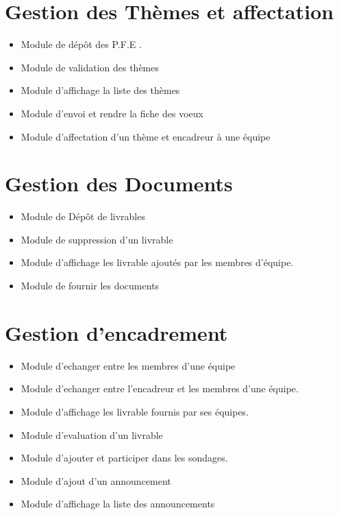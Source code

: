 \documentclass[11pt,fleqn]{book} %
\begin{document}
\section{Gestion des Thèmes et affectation}
\begin{itemize}
    \item Module de dépôt des P.F.E .
    \item Module de validation des thèmes
    \item Module d'affichage la liste des thèmes
    \item Module d'envoi et rendre la fiche des voeux
    \item Module d'affectation d'un thème et encadreur à une équipe\\
\end{itemize}


\section{Gestion des Documents}
\begin{itemize}
    \item Module de	Dépôt de livrables
    \item Module de suppression d'un livrable
    \item Module d'affichage les livrable ajoutés par les membres d'équipe.
    \item Module de fournir les documents\\
\end{itemize}


\section{Gestion d'encadrement}
\begin{itemize}
    \item Module d'echanger entre les membres d'une équipe
    \item Module d'echanger entre l'encadreur et les membres d'une équipe.
    \item Module d'affichage les livrable fournis par ses équipes.
    \item Module d'evaluation d'un livrable
    \item Module d'ajouter et participer dans les sondages.
    \item Module d'ajout d'un announcement
    \item Module d'affichage la liste des announcements\\
\end{itemize}
\end{document}
